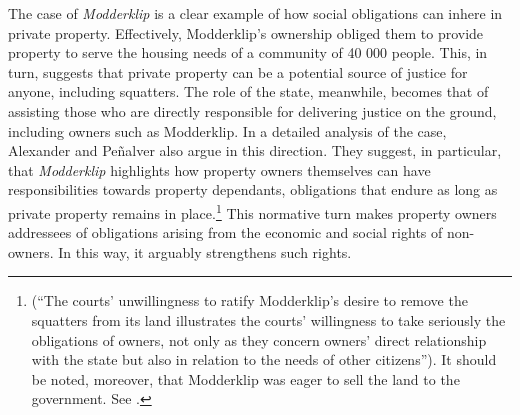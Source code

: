 
The case of {\it Modderklip} is a clear example of how social obligations can inhere in private property. Effectively, Modderklip's ownership obliged them to provide property to serve the housing needs of a community of 40 000 people. This, in turn, suggests that private property can be a potential source of justice for anyone, including squatters. The role of the state, meanwhile, becomes that of assisting those who are directly responsible for delivering justice on the ground, including owners such as Modderklip. In a detailed analysis of the case, Alexander and Pe\~{n}alver also argue in this direction. They suggest, in particular, that {\it Modderklip} highlights how property owners themselves can have responsibilities towards property dependants, obligations that endure as long as private property remains in place.\footnote{\cite[157]{alexander11} (``The courts' unwillingness to ratify Modderklip's desire to remove the squatters from its land illustrates the courts' willingness to take seriously the obligations of owners, not only as they concern owners' direct relationship with the state but also in relation to the needs of other citizens''). It should be noted, moreover, that Modderklip was eager to sell the land to the government. See \cite[61]{modderklip05}.} This normative turn makes property owners addressees of obligations arising from the economic and social rights of non-owners. In this way, it arguably strengthens such rights.

